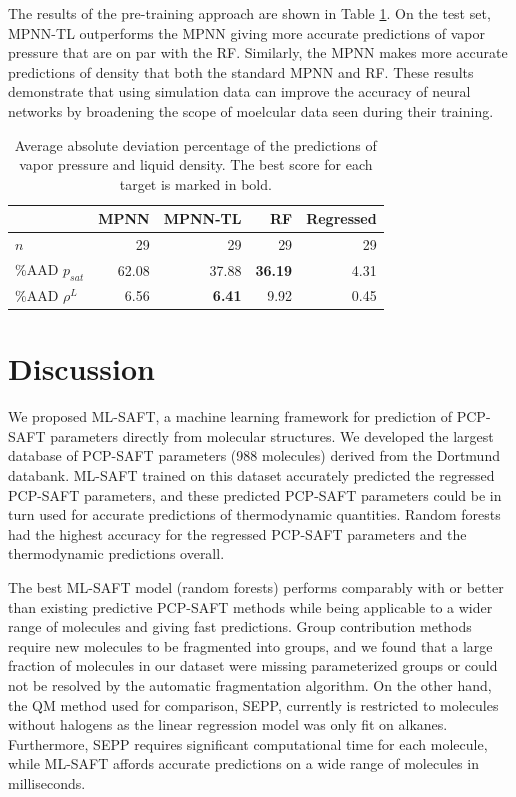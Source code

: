 The results of the pre-training approach are shown in Table \ref{tab:scores_tl}. On the test set, MPNN-TL outperforms the MPNN giving more accurate predictions of vapor pressure that are on par with the RF. Similarly, the MPNN makes more accurate predictions of density that both the standard MPNN and RF. These results demonstrate that using simulation data can improve the accuracy of neural networks by broadening the scope of moelcular data seen during their training. 

\begin{table}
    \caption{Average absolute deviation percentage of the predictions of vapor pressure and liquid density. The best score for each target is marked in bold.}
    \begin{center}
        \begin{tabular}{lrrr|r}
             & MPNN & MPNN-TL & RF & Regressed \\
            \hline
            $n$ & 29 & 29 & 29 & 29 \\
            \%AAD $p_{sat}$ & 62.08 & 37.88 & \textbf{36.19} & 4.31 \\
            \%AAD $\rho^{L}$ & 6.56 & \textbf{6.41} & 9.92 & 0.45 \\
        \end{tabular}
    \end{center}
    \label{tab:scores_tl}
\end{table}


\section{Discussion}

We proposed ML-SAFT, a machine learning framework for prediction of PCP-SAFT parameters directly from molecular structures. We developed the largest database of PCP-SAFT parameters (988 molecules) derived from the Dortmund databank. ML-SAFT trained on this dataset accurately predicted the regressed PCP-SAFT parameters, and these predicted PCP-SAFT parameters could be in turn used for accurate predictions of thermodynamic quantities. Random forests had the highest accuracy for the regressed PCP-SAFT parameters and the thermodynamic predictions overall.

The best ML-SAFT model (random forests) performs comparably with or better than existing predictive PCP-SAFT methods while being applicable to a wider range of molecules and giving fast predictions. Group contribution methods require new molecules to be fragmented into groups, and we found that a large fraction of molecules in our dataset were missing parameterized groups or could not be resolved by the automatic fragmentation algorithm. On the other hand, the QM method used for comparison, SEPP, currently is restricted to molecules without halogens as the linear regression model was only fit on alkanes. Furthermore, SEPP requires significant computational time for each molecule, while ML-SAFT affords accurate predictions on a wide range of molecules in milliseconds.

